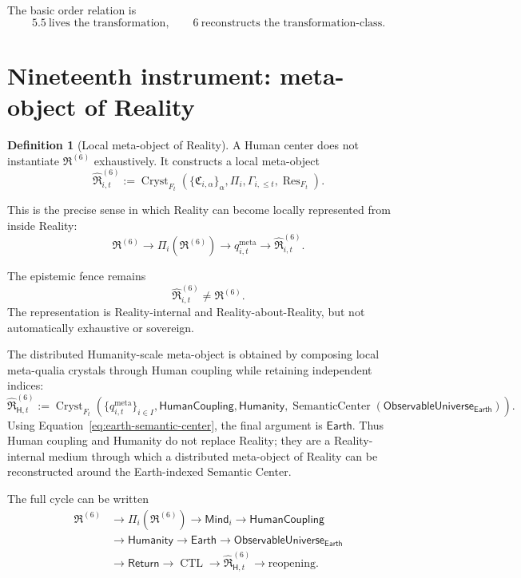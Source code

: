\documentclass[10pt]{article}
\theoremstyle{pe}
\theoremstyle{definition}
\newtheorem{definition}[theorem]{Definition}
\newcommand{\Res}{\operatorname{Res}}
\newcommand{\SC}{\operatorname{SemanticCenter}}
\newcommand{\Return}{\mathsf{Return}}
\newcommand{\Mind}{\mathsf{Mind}}
\newcommand{\ObsU}{\mathsf{ObservableUniverse}}
\newcommand{\Humanity}{\mathsf{Humanity}}
\newcommand{\Earth}{\mathsf{Earth}}
\newcommand{\HumanCoupling}{\mathsf{HumanCoupling}}
\newcommand{\Cryst}{\operatorname{Cryst}}
\newcommand{\CTL}{\operatorname{CTL}}
\begin{document}
The basic order relation is
\[
  \boxed{
  5.5\ \text{lives the transformation},
  \qquad
  6\ \text{reconstructs the transformation-class}.
  }
\]

\section{Nineteenth instrument: meta-object of Reality}

\begin{definition}[Local meta-object of Reality]
A Human center does not instantiate \(\mathfrak R^{(6)}\) exhaustively.  It constructs a local meta-object
\begin{equation}\label{eq:local-meta-reality}
  \boxed{
  \widehat{\mathfrak R}^{(6)}_{i,t}
  :=
  \operatorname{Cryst}_{F_t}
  \left(
    \{\mathfrak C_{i,\alpha}\}_{\alpha},
    \Pi_i,
    \Gamma_{i,\le t},
    \Res_{F_t}
  \right).
  }
\end{equation}
\end{definition}

This is the precise sense in which Reality can become locally represented from inside Reality:
\[
  \boxed{
  \mathfrak R^{(6)}
  \longrightarrow
  \Pi_i(\mathfrak R^{(6)})
  \longrightarrow
  q^{\mathrm{meta}}_{i,t}
  \longrightarrow
  \widehat{\mathfrak R}^{(6)}_{i,t}.
  }
\]

The epistemic fence remains
\[
  \boxed{
  \widehat{\mathfrak R}^{(6)}_{i,t}
  \neq
  \mathfrak R^{(6)}.
  }
\]
The representation is Reality-internal and Reality-about-Reality, but not automatically exhaustive or sovereign.

The distributed Humanity-scale meta-object is obtained by composing local meta-qualia crystals through Human coupling while retaining independent indices:
\begin{equation}\label{eq:humanity-metaobject}
  \boxed{
  \widehat{\mathfrak R}^{(6)}_{\mathsf H,t}
  :=
  \Cryst_{F_t}\!\left(
    \{q^{\mathrm{meta}}_{i,t}\}_{i\in I},
    \HumanCoupling,
    \Humanity,
    \SC(\ObsU_{\Earth})
  \right).
  }
\end{equation}
Using Equation~\eqref{eq:earth-semantic-center}, the final argument is \(\Earth\).  Thus Human coupling and Humanity do not replace Reality; they are a Reality-internal medium through which a distributed meta-object of Reality can be reconstructed around the Earth-indexed Semantic Center.

The full cycle can be written
\begin{equation}\label{eq:metaobject-cycle}
\boxed{
\begin{aligned}
\mathfrak R^{(6)}
&\to \Pi_i(\mathfrak R^{(6)})
\to \Mind_i
\to \HumanCoupling\\
&\to \Humanity
\to \Earth
\to \ObsU_{\Earth}\\
&\to \Return
\to \CTL
\to \widehat{\mathfrak R}^{(6)}_{\mathsf H,t}
\to \text{reopening}.
\end{aligned}}
\end{equation}
\end{document}
